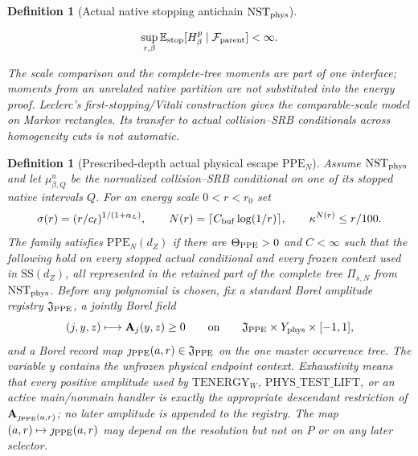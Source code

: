 \documentclass[11pt]{article}
\newtheorem{definition}[theorem]{Definition}
\begin{document}
\begin{definition}[Actual native stopping antichain
$\mathrm{NST}_{\rm phys}$]
\begin{enumerate}[label=\textup{(NST\arabic*)}]
      \begin{equation}
      \label{eq:stopped-H-moment}
       \sup_{r,\beta}
       \mathbb E_{\rm stop}[H_\beta^p\mid\mathcal F_{\rm parent}]<\infty .
      \end{equation}
\end{enumerate}
The scale comparison and the complete-tree moments are part of one interface;
moments from an unrelated native partition are not substituted into the
energy proof.  Leclerc's first-stopping/Vitali construction
\cite[Section~4]{Leclerc2026} gives the comparable-scale model on Markov
rectangles.  Its transfer to actual
collision--SRB conditionals across homogeneity cuts is not automatic.
\end{definition}

\begin{definition}[Prescribed-depth actual physical escape
$\mathrm{PPE}_{N}$]
\label{def:physical-legal-extension}
Assume $\mathrm{NST}_{\rm phys}$ and let $\mu^u_{\beta,Q}$ be the
normalized collision--SRB conditional on one of its stopped native intervals
$Q$.  For an energy scale $0<r<r_0$ set
\begin{equation}
\label{eq:prescribed-energy-depth}
 \sigma(r)=(r/c_\ell)^{1/(1+\alpha_L)},\qquad
 N(r)=\lceil C_{\rm buf}\log(1/r)\rceil ,
 \qquad \kappa^{N(r)}\le r/100 .
\end{equation}
The family satisfies $\mathrm{PPE}_{N}(d_Z)$ if there are
$\Theta_{\rm PPE}>0$ and $C<\infty$ such that the following hold on every
stopped actual conditional and every frozen context used in
$\mathrm{SS}(d_Z)$, all represented in the retained part of the complete
tree $\Pi_{s,N}$ from $\mathrm{NST}_{\rm phys}$.
Before any polynomial is chosen, fix a standard Borel amplitude registry
$\mathfrak J_{\rm PPE}$, a jointly Borel field
\[
 (j,y,z)\longmapsto \mathbf A_j(y,z)\ge0
 \qquad\hbox{on}\qquad
 \mathfrak J_{\rm PPE}\times Y_{\rm phys}\times[-1,1],
\]
and a Borel record map
$\jmath_{\rm PPE}(a,r)\in\mathfrak J_{\rm PPE}$ on the one master
occurrence tree.  The variable $y$ contains the unfrozen physical endpoint
context.  Exhaustivity means that every positive amplitude used by
$\mathrm{TENERGY}_{W}$, $\mathrm{PHYS\_TEST\_LIFT}$, or an active
main/nonmain handler is exactly the appropriate descendant restriction of
$\mathbf A_{\jmath_{\rm PPE}(a,r)}$; no later amplitude is appended to the
registry.  The map $(a,r)\mapsto\jmath_{\rm PPE}(a,r)$ may depend on the
resolution but not on $P$ or on any later selector.
\begin{enumerate}[label=\textup{(PPE\arabic*)}]

\end{enumerate}
\end{definition}
\end{document}
